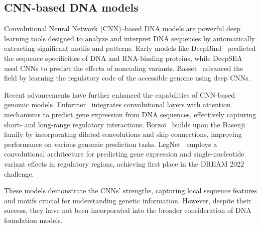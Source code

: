\subsection{CNN-based DNA models}

Convolutional Neural Network (CNN)--based DNA models are powerful deep learning tools designed to analyze and interpret DNA sequences by automatically extracting significant motifs and patterns. Early models like DeepBind~\citep{alipanahi2015predicting} predicted the sequence specificities of DNA and RNA-binding proteins, while DeepSEA~\citep{zhou2015predicting} used CNNs to predict the effects of noncoding variants. Basset~\citep{kelley2016basset} advanced the field by learning the regulatory code of the accessible genome using deep CNNs.

Recent advancements have further enhanced the capabilities of CNN-based genomic models. Enformer~\citep{avsec2021effective} integrates convolutional layers with attention mechanisms to predict gene expression from DNA sequences, effectively capturing short- and long-range regulatory interactions. Borzoi~\citep{linder2023borzoi} builds upon the Basenji~\citep{kelley2018sequential} family by incorporating dilated convolutions and skip connections, improving performance on various genomic prediction tasks. LegNet~\citep{penzar2023legnet} employs a convolutional architecture for predicting gene expression and single-nucleotide variant effects in regulatory regions, achieving first place in the DREAM 2022 challenge.

These models demonstrate the CNNs' strengths, capturing local sequence features and motifs crucial for understanding genetic information. However, despite their success, they have not been incorporated into the broader consideration of DNA foundation models.
